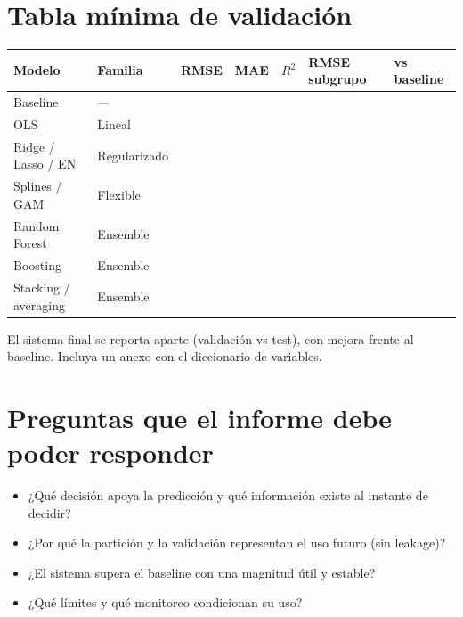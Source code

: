 \documentclass[11pt,letterpaper]{article}
\begin{document}
\section*{Tabla mínima de validación}
\begin{center}\small
\begin{tabular}{lllllll}
\toprule
Modelo & Familia & RMSE & MAE & $R^2$ & RMSE subgrupo & vs baseline \\
\midrule
Baseline & --- & & & & & \\
OLS & Lineal & & & & & \\
Ridge / Lasso / EN & Regularizado & & & & & \\
Splines / GAM & Flexible & & & & & \\
Random Forest & Ensemble & & & & & \\
Boosting & Ensemble & & & & & \\
Stacking / averaging & Ensemble & & & & & \\
\bottomrule
\end{tabular}\end{center}

El sistema final se reporta aparte (validación vs test), con mejora frente al baseline. Incluya un anexo con el diccionario de variables.

\section*{Preguntas que el informe debe poder responder}
\begin{itemize}
\item ¿Qué decisión apoya la predicción y qué información existe al instante de decidir?
\item ¿Por qué la partición y la validación representan el uso futuro (sin leakage)?
\item ¿El sistema supera el baseline con una magnitud útil y estable?
\item ¿Qué límites y qué monitoreo condicionan su uso?
\end{itemize}
\end{document}
